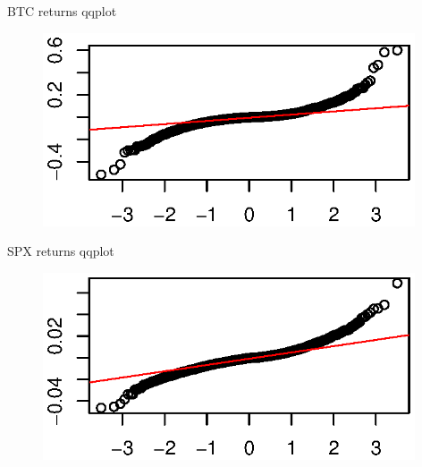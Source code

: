 \documentclass{beamer}
\begin{document}
\begin{frame}{BTC returns qqplot}
	\begin{figure}[linewidth=250mm]	
		\includegraphics[width=110mm]{BITCOINqqplot.eps}
	\end{figure}
\end{frame}
\begin{frame}{SPX returns qqplot}
	\begin{figure}[b]	
		\includegraphics[width=110mm]{S&P500qqplot.eps}
	\end{figure}
\end{frame}
\end{document}
